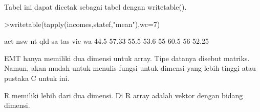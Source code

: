 \documentclass[a4paper,10pt]{article}
\begin{document}
\begin{eulernotebook}
\begin{eulercomment}
\begin{eulercomment}
\begin{eulercomment}
\begin{eulercomment}
\begin{eulercomment}
\begin{eulercomment}
\begin{eulercomment}
\begin{eulercomment}
\begin{eulercomment}
\begin{eulercomment}
\begin{eulercomment}
\begin{eulercomment}
\begin{eulercomment}
\begin{eulercomment}
\begin{eulercomment}
\begin{eulercomment}
\begin{eulercomment}
\begin{eulercomment}
\begin{eulercomment}
Tabel ini dapat dicetak sebagai tabel dengan writetable().
\end{eulercomment}
\begin{eulerprompt}
>writetable(tapply(incomes,statef,"mean"),wc=7)
\end{eulerprompt}
\begin{euleroutput}
      act    nsw     nt    qld     sa    tas    vic     wa
     44.5  57.33   55.5   53.6     55   60.5     56  52.25
\end{euleroutput}
\begin{eulercomment}
EMT hanya memiliki dua dimensi untuk array. Tipe datanya disebut
matriks. Namun, akan mudah untuk menulis fungsi untuk dimensi yang
lebih tinggi atau pustaka C untuk ini.

R memiliki lebih dari dua dimensi. Di R array adalah vektor dengan
bidang dimensi.


\end{eulercomment}
\end{eulercomment}
\end{eulercomment}
\end{eulercomment}
\end{eulercomment}
\end{eulercomment}
\end{eulercomment}
\end{eulercomment}
\end{eulercomment}
\end{eulercomment}
\end{eulercomment}
\end{eulercomment}
\end{eulercomment}
\end{eulercomment}
\end{eulercomment}
\end{eulercomment}
\end{eulercomment}
\end{eulercomment}
\end{eulercomment}
\end{eulernotebook}
\end{document}
